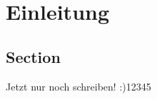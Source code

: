 \chapter{Einleitung}\label{cha:Einleitung}



\section{Section}\label{sec:Section}

Jetzt nur noch schreiben! :)12345



